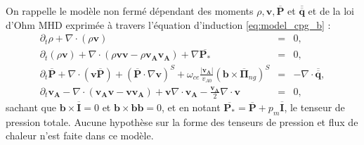 On rappelle le modèle non fermé dépendant des moments $\rho, \boldsymbol{v}, \overline{\boldsymbol{P}}$ et $\overline{\overline{\boldsymbol{q}}}$ et de la loi d'Ohm \acs{MHD} exprimée à travers l'équation d'induction \eqref{eq:model_cpg_b} : 
\begin{eqnarray}
\label{eq:model_cpg_r} \partial_t \rho + \nabla \cdot \left(\rho \boldsymbol{v}\right) &=& 0,\\
\label{eq:model_cpg_v} \partial_t \left(\rho \boldsymbol{v}\right) + \nabla \cdot \left(\rho \boldsymbol{v}\boldsymbol{v} - \rho \boldsymbol{v_A}\boldsymbol{v_A}\right) +  \nabla \overline{\boldsymbol{P_*}}  &=& 0 , \\
\label{eq:model_cpg_P} \partial_t \overline{\boldsymbol{P}} + \nabla \cdot \left( \boldsymbol{v} \overline{\boldsymbol{P}} \right) +  \left(\overline{\boldsymbol{P}} \cdot \nabla \boldsymbol{v}\right)^S + \omega_{ce} \frac{|\boldsymbol{v_A}|}{v_{A0}} \left(\boldsymbol{b}\times \overline{\boldsymbol{\Pi}}_{ng}\right)^S  & =& - \nabla \cdot \overline{\overline{\boldsymbol{q}}} ,\\
\label{eq:model_cpg_b} \partial_t \boldsymbol{v_A} -  \nabla \cdot \left(\boldsymbol{v_A}\boldsymbol{v} - \boldsymbol{v}\boldsymbol{v_A}\right) +  \boldsymbol{v} \nabla \cdot \boldsymbol{v_A} -  \frac{\boldsymbol{v_A}}{2}  \nabla \cdot \boldsymbol{v} &=& 0 ,
\end{eqnarray}
sachant que $\boldsymbol{b}\times \overline{\boldsymbol{I}} = 0$ et $\boldsymbol{b}\times \boldsymbol{b}\boldsymbol{b} = 0$, et en notant $\overline{\boldsymbol{P_*}} = \overline{\boldsymbol{P}} + p_m \overline{\boldsymbol{I}}$, le tenseur de pression totale. Aucune hypothèse sur la forme des tenseurs de pression et flux de chaleur n'est faite dans ce modèle. 

